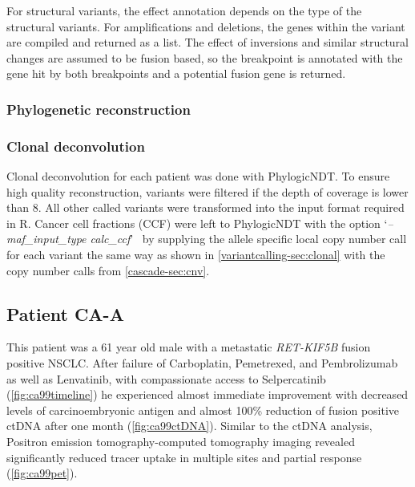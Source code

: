 For structural variants, the effect annotation depends on the type of the structural variants. For amplifications and deletions, the genes within the variant are compiled and returned as a list. The effect of inversions and similar structural changes are assumed to be fusion based, so the breakpoint is annotated with the gene hit by both breakpoints and a potential fusion gene is returned.


\subsubsection{Phylogenetic reconstruction}
\label{cascade-sec:phylo}

\subsubsection{Clonal deconvolution}
\label{cascade-sec:clonaldecon}

Clonal deconvolution for each patient was done with PhylogicNDT. To ensure high quality reconstruction, variants were filtered if the depth of coverage is lower than 8. All other called variants were transformed into the input format required in R. Cancer cell fractions (CCF) were left to PhylogicNDT with the option \lq\emph{--maf\_input\_type calc\_ccf}\rq~ by supplying the allele specific local copy number call for each variant the same way as shown in \autoref{variantcalling-sec:clonal} with the copy number calls from \autoref{cascade-sec:cnv}.

\subsection{Patient CA-A}
\label{cascade-sec:CA99}

This patient was a 61 year old male  with a metastatic \textit{RET-KIF5B} fusion positive NSCLC. After failure of Carboplatin, Pemetrexed, and Pembrolizumab as well as Lenvatinib, with compassionate access to Selpercatinib (\autoref{fig:ca99timeline}) he experienced almost immediate improvement with decreased levels of carcinoembryonic antigen and almost 100\% reduction of fusion positive ctDNA after one month (\autoref{fig:ca99ctDNA}). Similar to the ctDNA analysis, Positron emission tomography-computed tomography imaging revealed significantly reduced tracer uptake in multiple sites and partial response (\autoref{fig:ca99pet}).

